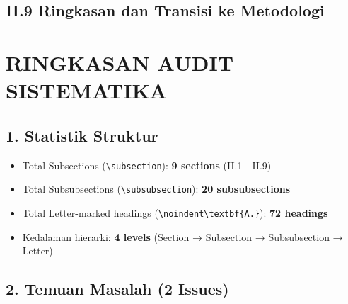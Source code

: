 \documentclass[11pt,a4paper]{article}
\begin{document}
\vspace{0.5em}

\subsection*{II.9 Ringkasan dan Transisi ke Metodologi}


\newpage
\section*{RINGKASAN AUDIT SISTEMATIKA}

\subsection*{1. Statistik Struktur}
\begin{itemize}[leftmargin=*]
    \item Total Subsections (\texttt{\textbackslash subsection}): \textbf{9 sections} (II.1 - II.9)
    \item Total Subsubsections (\texttt{\textbackslash subsubsection}): \textbf{20 subsubsections}
    \item Total Letter-marked headings (\texttt{\textbackslash noindent\textbackslash textbf\{A.\}}): \textbf{72 headings}
    \item Kedalaman hierarki: \textbf{4 levels} (Section → Subsection → Subsubsection → Letter)
\end{itemize}

\subsection*{2. Temuan Masalah (2 Issues)}
\end{document}

